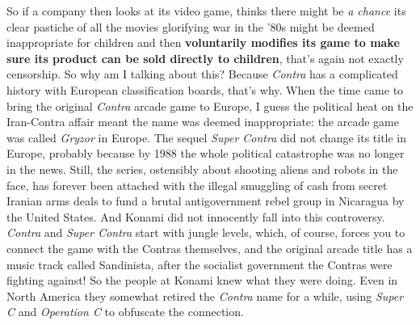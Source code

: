 \documentclass{book}
\let\oldcenter\center
\let\oldendcenter\endcenter
\renewenvironment{center}{\setlength\topsep{0pt}\oldcenter}{\oldendcenter}
\begin{document}
\begin{center}
\quad\vspace{4pt}
\quad\vspace{4pt}
\quad\vspace{4pt}
\end{center}

So if a company then looks at its video game, thinks there might be \emph{a chance} its clear pastiche of all the movies glorifying war in the ’80s might be deemed inappropriate for children and then \textbf{voluntarily modifies its game to make sure its product can be sold directly to children}, that’s again not exactly censorship. So why am I talking about this? Because \emph{Contra} has a complicated history with European classification boards, that’s why. When the time came to bring the original \emph{Contra} arcade game to Europe, I guess the political heat on the Iran-Contra affair meant the name was deemed inappropriate: the arcade game was called \emph{Gryzor} in Europe. The sequel \emph{Super Contra} did not change its title in Europe, probably because by 1988 the whole political catastrophe was no longer in the news. Still, the series, ostensibly about shooting aliens and robots in the face, has forever been attached with the illegal smuggling of cash from secret Iranian arms deals to fund a brutal antigovernment rebel group in Nicaragua by the United States. And Konami did not innocently fall into this controversy. \emph{Contra} and \emph{Super Contra} start with jungle levels, which, of course, forces you to connect the game with the Contras themselves, and the original arcade title has a music track called Sandinista, after the socialist government the Contras were fighting against! So the people at Konami knew what they were doing. Even in North America they somewhat retired the \emph{Contra} name for a while, using \emph{Super C} and \emph{Operation C} to obfuscate the connection.
\end{document}

